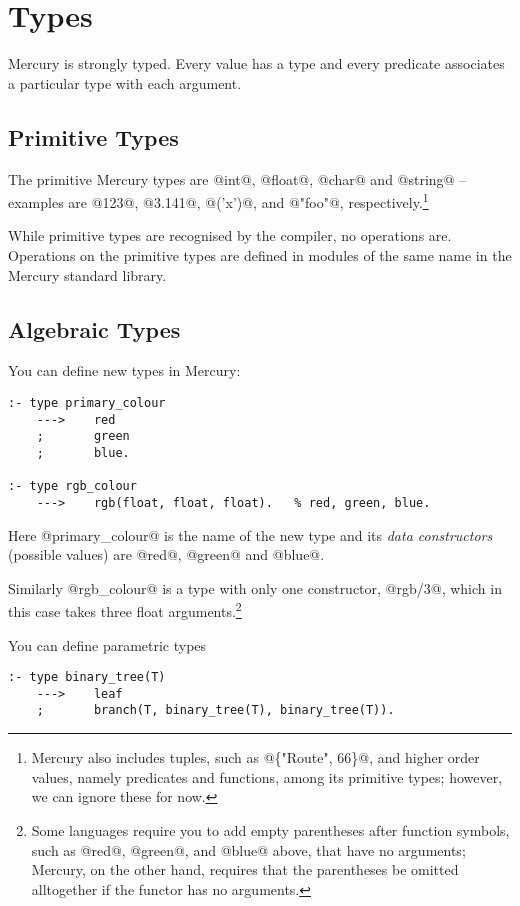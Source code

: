 \section{Types}

Mercury is strongly typed.  Every value has a type and every
predicate associates a particular type with each argument.

\subsection{Primitive Types}

The primitive Mercury types are @int@, @float@, @char@ and @string@ --
examples are @123@, @3.141@, @('x')@, and @"foo"@,
respectively.\footnote{Mercury also includes tuples, such as @\{"Route",
66\}@, and higher order values, namely predicates and functions, among
its primitive types; however, we can ignore these for now.}

While primitive types are recognised by the compiler, no
operations are.  Operations on the primitive types are defined in
modules of the same name in the Mercury standard library.

\subsection{Algebraic Types}

You can define new types in Mercury:
\begin{verbatim}
:- type primary_colour
    --->    red
    ;       green
    ;       blue.

:- type rgb_colour
    --->    rgb(float, float, float).   % red, green, blue.
\end{verbatim}

Here @primary_colour@ is the name of the new type and its
\emph{data constructors} (possible values) are @red@, @green@ and @blue@.

Similarly @rgb_colour@ is a type with only one constructor,
@rgb/3@, which in this case takes three float arguments.\footnote{Some languages require you to add empty parentheses
after function symbols, such as @red@, @green@, and @blue@ above,
that have no arguments; Mercury, on the other hand, requires
that the parentheses be omitted alltogether if the functor has
no arguments.}

You can define parametric types
\begin{verbatim}
:- type binary_tree(T)
    --->    leaf
    ;       branch(T, binary_tree(T), binary_tree(T)).
\end{verbatim}

